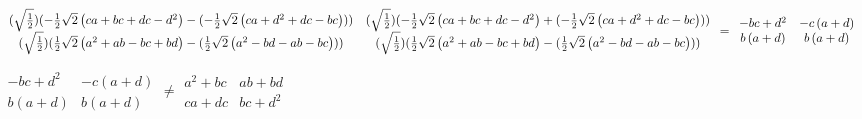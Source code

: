 \documentclass{article}
\begin{document}
$\allowbreak 
\begin{array}{cc}
(\sqrt{\frac{1}{2}})(-\frac{1}{2}\sqrt{2}\left( ca+bc+dc-d^{2}\right) -(-%
\frac{1}{2}\sqrt{2}\left( ca+d^{2}+dc-bc\right) )) & (\sqrt{\frac{1}{2}})(-%
\frac{1}{2}\sqrt{2}\left( ca+bc+dc-d^{2}\right) +(-\frac{1}{2}\sqrt{2}\left(
ca+d^{2}+dc-bc\right) )) \\ 
(\sqrt{\frac{1}{2}})(\frac{1}{2}\sqrt{2}\left( a^{2}+ab-bc+bd\right) -(\frac{%
1}{2}\sqrt{2}\left( a^{2}-bd-ab-bc\right) )) & (\sqrt{\frac{1}{2}})(\frac{1}{%
2}\sqrt{2}\left( a^{2}+ab-bc+bd\right) -(\frac{1}{2}\sqrt{2}\left(
a^{2}-bd-ab-bc\right) ))
\end{array}
\allowbreak =\allowbreak 
\begin{array}{cc}
-bc+d^{2} & -c\left( a+d\right)  \\ 
b\left( a+d\right)  & b\left( a+d\right) 
\end{array}
$

{\tiny \bigskip }

$\allowbreak 
\begin{array}{cc}
-bc+d^{2} & -c\left( a+d\right)  \\ 
b\left( a+d\right)  & b\left( a+d\right) 
\end{array}
\neq \allowbreak 
\begin{array}{cc}
a^{2}+bc & ab+bd \\ 
ca+dc & bc+d^{2}
\end{array}
$
\end{document}
